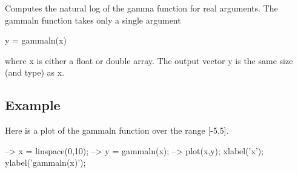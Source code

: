 Computes the natural log of the gamma function for real arguments. The {\ttfamily gammaln} function takes only a single argument \begin{DoxyVerb}  y = gammaln(x)
\end{DoxyVerb}
 where {\ttfamily x} is either a {\ttfamily float} or {\ttfamily double} array. The output vector {\ttfamily y} is the same size (and type) as {\ttfamily x}. \hypertarget{variables_struct_Example}{}\subsection{Example}\label{variables_struct_Example}
Here is a plot of the {\ttfamily gammaln} function over the range {\ttfamily \mbox{[}-\/5,5\mbox{]}}.


\begin{DoxyVerbInclude}
--> x = linspace(0,10);
--> y = gammaln(x);
--> plot(x,y); xlabel('x'); ylabel('gammaln(x)');
\end{DoxyVerbInclude}


